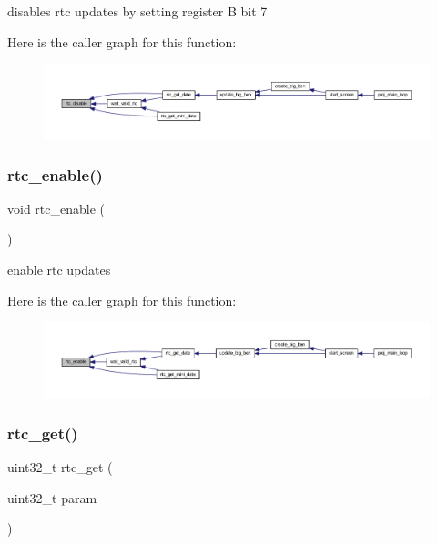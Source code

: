 disables rtc updates by setting register B bit 7 

Here is the caller graph for this function\+:
\nopagebreak
\begin{figure}[H]
\begin{center}
\leavevmode
\includegraphics[width=350pt]{group__rtc_gaeb55d907395f650cc700c948cfc6eadb_icgraph}
\end{center}
\end{figure}
\mbox{\label{group__rtc_gac9d2c3fa04a4b1bc66a5175136feb12f}} 
\subsubsection{\texorpdfstring{rtc\+\_\+enable()}{rtc\_enable()}}
{\footnotesize\ttfamily void rtc\+\_\+enable (\begin{DoxyParamCaption}{ }\end{DoxyParamCaption})}



enable rtc updates 

Here is the caller graph for this function\+:
\nopagebreak
\begin{figure}[H]
\begin{center}
\leavevmode
\includegraphics[width=350pt]{group__rtc_gac9d2c3fa04a4b1bc66a5175136feb12f_icgraph}
\end{center}
\end{figure}
\mbox{\label{group__rtc_gaad751240f0c6796cade2289071c711c9}} 
\subsubsection{\texorpdfstring{rtc\+\_\+get()}{rtc\_get()}}
{\footnotesize\ttfamily uint32\+\_\+t rtc\+\_\+get (\begin{DoxyParamCaption}\item[{uint32\+\_\+t}]{param }\end{DoxyParamCaption})}



